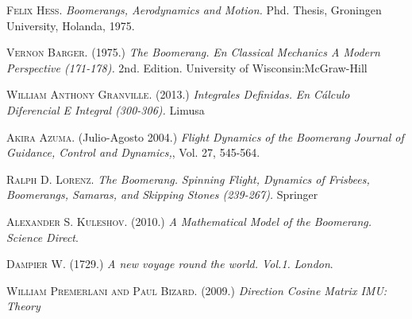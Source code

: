 \begin{thebibliography}{X}

 \textsc{Felix Hess.} \textit{Boomerangs, Aerodynamics and Motion.} Phd. Thesis, Groningen University, Holanda, 1975.

 \textsc{Vernon Barger.} (1975.) \textit{The Boomerang.} \textit{En Classical Mechanics A Modern Perspective (171-178).} 2nd. Edition. University of Wisconsin:McGraw-Hill

 \textsc{William Anthony Granville.} (2013.) \textit{Integrales Definidas.} \textit{En Cálculo Diferencial E Integral (300-306).} Limusa

 \textsc{Akira Azuma.} (Julio-Agosto 2004.) \textit{Flight Dynamics of the Boomerang} \textit{Journal of Guidance, Control and Dynamics,}, Vol. 27, 545-564.

 \textsc{Ralph D. Lorenz.} \textit{The Boomerang.} \textit{Spinning Flight, Dynamics of Frisbees, Boomerangs, Samaras, and Skipping Stones (239-267).} Springer

 \textsc{Alexander S. Kuleshov.} (2010.) \textit{A Mathematical Model of the Boomerang.} \textit{Science Direct}.

 \textsc{Dampier W.} (1729.) \textit{A new voyage round the world. Vol.1.} \textit{London}.

 \textsc{William Premerlani and Paul Bizard.} (2009.) \textit{Direction Cosine Matrix IMU: Theory}

\end{thebibliography}